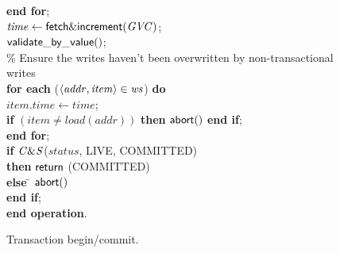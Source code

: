 \documentclass[11pt,letterpaper]{article}
\begin{document}
\begin{figure} [htb]
{{\begin{minipage}[t]{150mm}
\begin{tabbing}
 \> {\bf end for}; \\

 \> $\mathit{time} \gets {\sf fetch\&increment}(\mathit{GVC})$; \\

 \> ${\sf validate\_by\_value}()$;  \\


\> \% Ensure the writes haven't been overwritten by non-transactional writes \\
 \> 
{\bf for each} ($\left \langle \mathit{addr, item} \right \rangle  \in \mathit{ws}$) {\bf do} \\
 \>\> $\mathit{item.time} \gets \mathit{time}$; \\
 \>\> {\bf if} $(\mathit{item} \neq load(\mathit{addr}))$  
                 {\bf then}  
                   ${\sf abort}()$ 
                {\bf end if}; \\

 \> {\bf end for}; \\
 \> {\bf if} ${\sf \mathit{C\&S}}$($\mathit{status}$, LIVE, COMMITTED) \\
 \>\> {\bf then} \> ${\sf return}$ (COMMITTED)\\
 \> \> {\bf else} \= ${\sf abort}()$ \\
 \> {\bf end if};  \\
{\bf end operation}.

\end{tabbing}
\normalsize
\end{minipage}
}
\caption{Transaction begin/commit.}
\label{fig:tbc}
}
\end{figure}
\end{document}

